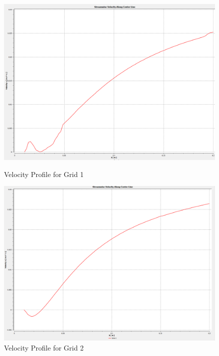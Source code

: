 \begin{figure}[H]
    \centering
    \begin{minipage}{0.45\textwidth}
        \centering
        \includegraphics[width=\textwidth]{Questions/Figures/u velocity along centerline grid 1.png}
        \caption{Velocity Profile for Grid 1}
        \label{fig:velocity_profile_grid_1}
    \end{minipage}
    \begin{minipage}{0.45\textwidth}
        \centering
        \includegraphics[width=\textwidth]{Questions/Figures/u velocity along centerline grid 2.png}
        \caption{Velocity Profile for Grid 2}
        \label{fig:velocity_profile_grid_2}
    \end{minipage}
\end{figure}
